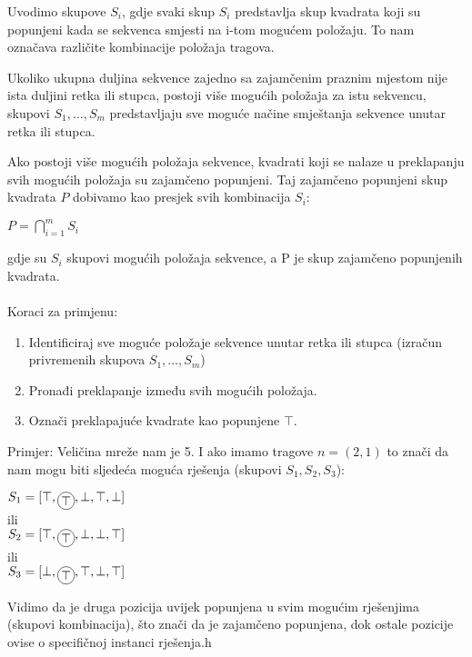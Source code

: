 \documentclass[a4paper,12pt]{article}
\begin{document}
Uvodimo skupove $S_i$, gdje svaki skup $S_i$ predstavlja skup kvadrata koji su popunjeni kada se sekvenca smjesti na i-tom mogućem položaju. To nam označava različite kombinacije položaja tragova.

Ukoliko ukupna duljina sekvence zajedno sa zajamčenim praznim mjestom nije ista duljini retka ili stupca, postoji više mogućih položaja za istu sekvencu, skupovi $S_1, \dots ,S_m$ predstavljaju sve moguće načine smještanja sekvence unutar retka ili stupca.

Ako postoji više mogućih položaja sekvence, kvadrati koji se nalaze u preklapanju svih mogućih položaja su zajamčeno popunjeni. Taj zajamčeno popunjeni skup kvadrata $P$ dobivamo kao presjek svih kombinacija $S_i$:
\begin{center}
$P = \bigcap_{i=1}^{m} S_i$
\end{center}
gdje su $S_i$ skupovi mogućih položaja sekvence, a P je skup zajamčeno popunjenih kvadrata.\\\\
Koraci za primjenu:
\begin{enumerate}
    \item Identificiraj sve moguće položaje sekvence unutar retka ili stupca (izračun privremenih skupova $S_1, \dots ,S_m$)
    \item Pronađi preklapanje između svih mogućih položaja.
    \item Označi preklapajuće kvadrate kao popunjene $\top$.
\end{enumerate}

Primjer: Veličina mreže nam je 5. I ako imamo tragove $n = (2,1)$ to znači da nam mogu biti sljedeća moguća rješenja (skupovi $S_1, S_2 ,S_3$):

\newcommand{\circledtop}{\tikz[baseline]{\node[draw, circle, inner sep=1pt] {\(\top\)};}}
\begin{center}
$S_1 = [\top, \circledtop, \bot, \top, \bot]$\\
ili\\
$S_2 = [\top, \circledtop, \bot, \bot, \top]$\\
ili\\
$S_3 = [\bot, \circledtop, \top, \bot, \top]$
\end{center}

Vidimo da je druga pozicija uvijek popunjena u svim mogućim rješenjima (skupovi kombinacija), što znači da je zajamčeno popunjena, dok ostale pozicije ovise o specifičnoj instanci rješenja.h
\\
\end{document}
